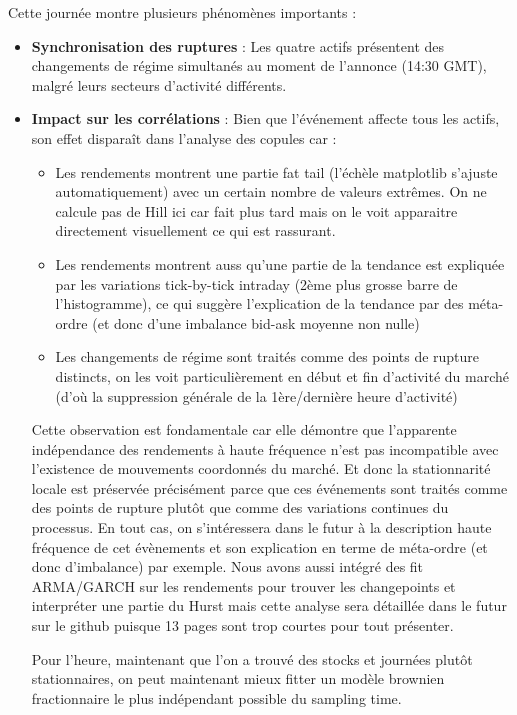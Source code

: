 \documentclass[10pt,a4paper]{article}
\theoremstyle{definition}
\theoremstyle{remark}
\begin{document}
Cette journée montre plusieurs phénomènes importants :

\begin{itemize}
    \item \textbf{Synchronisation des ruptures} : Les quatre actifs présentent des changements de régime simultanés au moment de l'annonce (14:30 GMT), malgré leurs secteurs d'activité différents.

    \item \textbf{Impact sur les corrélations} : Bien que l'événement affecte tous les actifs, son effet disparaît dans l'analyse des copules car :
\begin{itemize}
        \item Les rendements montrent une partie fat tail (l'échèle matplotlib s'ajuste automatiquement) avec un certain nombre de valeurs extrêmes. On ne calcule pas de Hill ici car fait plus tard mais on le voit apparaitre directement visuellement ce qui est rassurant.
        \item Les rendements montrent auss qu'une partie de la tendance est expliquée par les variations tick-by-tick intraday (2ème plus grosse barre de l'histogramme), ce qui suggère l'explication de la tendance par des méta-ordre (et donc d'une imbalance bid-ask moyenne non nulle)
        \item Les changements de régime sont traités comme des points de rupture distincts, on les voit particulièrement en début et fin d'activité  du marché (d'où la suppression générale de la 1ère/dernière heure d'activité)
\end{itemize}


Cette observation est fondamentale car elle démontre que l'apparente indépendance des rendements à haute fréquence n'est pas incompatible avec l'existence de mouvements coordonnés du marché. 
Et donc la stationnarité locale est préservée précisément parce que ces événements sont traités comme des points de rupture plutôt que comme des variations continues du processus.
En tout cas, on s'intéressera dans le futur à la description haute fréquence de cet évènements et son explication en terme de méta-ordre (et donc d'imbalance) par exemple. 
Nous avons aussi intégré des fit ARMA/GARCH sur les rendements pour trouver les changepoints et interpréter une partie du Hurst mais cette analyse sera détaillée dans le futur sur le github puisque 13 pages sont trop courtes pour tout présenter.

Pour l'heure, maintenant que l'on a trouvé des stocks et journées plutôt stationnaires, on peut maintenant mieux fitter un modèle brownien fractionnaire le plus indépendant possible du sampling time.



\end{itemize}
\end{document}
